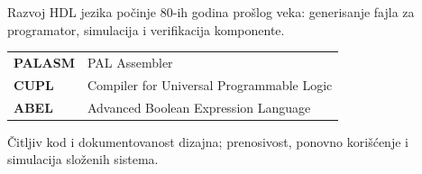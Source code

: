 \begin{frame}[label=07-s009]
Razvoj HDL jezika počinje 80-ih godina prošlog veka: generisanje fajla za programator, simulacija i verifikacija komponente.
\par\vspace{2mm}
\begin{tabularx}{\linewidth}{@{}lX@{}}
\textbf{PALASM} & PAL Assembler\\[1mm]
\textbf{CUPL} & Compiler for Universal Programmable Logic\\[1mm]
\textbf{ABEL} & Advanced Boolean Expression Language
\end{tabularx}
\par\vspace{3mm}
Čitljiv kod i dokumentovanost dizajna; prenosivost, ponovno korišćenje i simulacija složenih sistema.
\par\vspace{3mm}
\end{frame}
